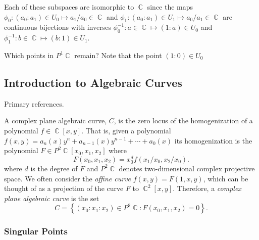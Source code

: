\documentclass[10pt,twoside]{article}
\theoremstyle{plain}
\theoremstyle{definition}
\numberwithin{equation}{section}
\DeclareMathOperator{\CC}{\mathbb{C}}
\begin{document}
Each of these subspaces are isomorphic to $\CC$ since the maps $\phi_0 :
(a_0 : a_1) \in U_0 \mapsto a_1 / a_0 \in \CC$ and $\phi_1 : (a_0 : a_1)
\in U_1 \mapsto a_0 / a_1 \in \CC$ are continuous bijections with
inverses $\phi^{-1}_0 : a \in \CC \mapsto (1 : a) \in U_0$ and
$\phi^{-1}_1 : b \in \CC \mapsto (b : 1) \in U_1$.

Which points in $P^1\CC$ remain? Note that the point $(1 : 0) \in U_0$



\subsection{Introduction to Algebraic Curves}

Primary references. \cite{Griffiths89, Ueno97}

A complex plane algebraic curve, $C$, is the zero locus of the
homogenization of a polynomial $f \in \CC[x,y]$. That is, given a
polynomial $f(x,y) = a_n(x) y^n + a_{n-1}(x)y^{n-1} + \cdots + a_0(x)$
its homogenization is the polynomial $F \in P^2\CC[x_0,x_1,x_2]$ where
\[
  F(x_0,x_1,x_2) = x_0^d f(x_1/x_0,x_2/x_0).
\]
where $d$ is the degree of $F$ and $P^2\CC$ denotes two-dimensional
complex projective space. We often consider the {\it affine curve}
$f(x,y) = F(1,x,y)$, which can be thought of as a projection of the
curve $F$ to $\CC^2[x,y]$. Therefore, a {\it complex plane algebraic
  curve} is the set
\[
  C = \left\{
  (x_0 : x_1 : x_2) \in P^2\CC : F(x_0,x_1,x_2) = 0
  \right\}.
\]

\subsubsection*{Singular Points}
\end{document}
